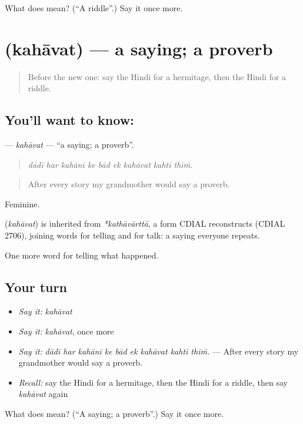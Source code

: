 \begin{tcolorbox}[breakable,colback=teal!4,colframe=teal!35!black,title={Before you move on}]
What does  mean? (\textquotedblleft{}A riddle\textquotedblright{}.) Say it once more.
\end{tcolorbox}
\section[\texorpdfstring{\hi{कहावत} (kahāvat)}{कहावत (kahāvat)}]{ (kahāvat) — a saying; a proverb}

\label{lesson:HI-C334-kahavat}



\begin{quote}
Before the new one: say the Hindi for a hermitage, then the Hindi for a riddle.
\end{quote}

\subsection*{You'll want to know: }
\textbf{} — \emph{kahāvat} — \textquotedblleft{}a saying; a proverb\textquotedblright{}.

\begin{quote}
        
\end{quote}

\begin{quote}
\emph{dādī har kahānī ke bād ek kahāvat kahtī thīṁ.}
\end{quote}

\begin{quote}
After every story my grandmother would say a proverb.
\end{quote}

Feminine.

\begin{cousinweb}
\textbf{} (\emph{kahāvat}) is inherited from \emph{*kathāvārttā}, a form CDIAL reconstructs (CDIAL 2706), joining words for telling and for talk: a saying everyone repeats.
\end{cousinweb}

\begin{grammarlens}[title={What you've built}]
One more word for telling what happened.
\end{grammarlens}

\subsection*{Your turn}
\begin{itemize}
\raggedright
  \item \emph{Say it:} \emph{kahāvat}
  \item \emph{Say it:} \emph{kahāvat}, once more
  \item \emph{Say it:} \emph{dādī har kahānī ke bād ek kahāvat kahtī thīṁ.} — After every story my grandmother would say a proverb.
  \item \emph{Recall:} say the Hindi for a hermitage, then the Hindi for a riddle, then say \emph{kahāvat} again
\end{itemize}

\begin{tcolorbox}[breakable,colback=teal!4,colframe=teal!35!black,title={Before you move on}]
What does  mean? (\textquotedblleft{}A saying; a proverb\textquotedblright{}.) Say it once more.
\end{tcolorbox}
